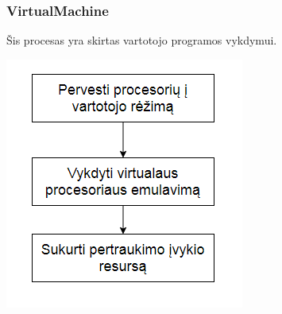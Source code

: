 \documentclass{scrartcl}
\begin{document}
      \subsubsection{VirtualMachine}
        Šis procesas yra skirtas vartotojo programos vykdymui.
        \begin{center}
          \includegraphics[scale=1]{VirtualMachine}
        \end{center}
\end{document}
